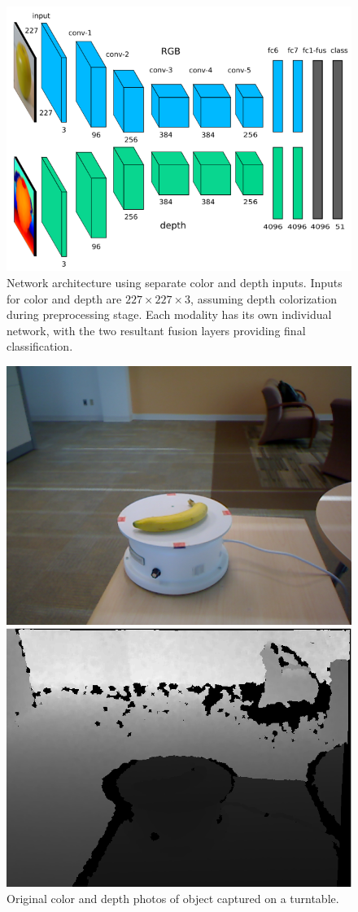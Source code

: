\begin{figure}
\includegraphics[width=\linewidth]{img/architecture.png} 
\caption{Network architecture using separate color and depth inputs. Inputs for color and depth are $227 \times 227 \times 3$, assuming depth colorization during preprocessing stage. Each modality has its own individual network, with the two resultant fusion layers providing final classification.}
\label{fig:network}
\end{figure}

\begin{figure}
    \centering
    \includegraphics[width=0.7\linewidth]{img/banana_1_1_1.png}

    \vspace{0.4cm}
    \includegraphics[width=0.7\linewidth]{img/banana_1_1_1_depth.png}
    \caption{Original color and depth photos of object captured on a turntable.}
    \label{fig:orig_img}
\end{figure}

